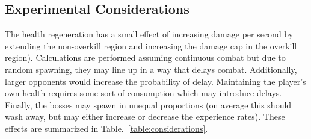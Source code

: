 \documentclass[../../main.tex]{subfiles}
\begin{document}
		\subsection{Experimental Considerations}
			The health regeneration has a small effect of increasing damage per second by extending the non-overkill region and increasing the damage cap in the overkill region). Calculations are performed assuming continuous combat but due to random spawning, they may line up in a way that delays combat. Additionally, larger opponents would increase the probability of delay. Maintaining the player's own health requires some sort of consumption which may introduce delays. Finally, the bosses may spawn in unequal proportions (on average this should wash away, but may either increase or decrease the experience rates). These effects are summarized in Table.~\ref{table:considerations}.
\end{document}
